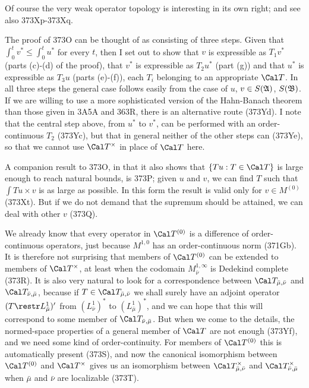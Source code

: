 {Of course the very weak operator topology is interesting in its own
right;  and see also 373Xp-373Xq.
     
The proof of 373O can be thought of as consisting of three steps.
Given that $\int_0^tv^*\le\int_0^tu^*$ for every $t$, then I set out to
show that $v$ is expressible as $T_1v^*$ (parts (c)-(d) of the proof),
that $v^*$ is expressible as $T_2u^*$ (part (g)) and that $u^*$ is
expressible as $T_3u$
(parts (e)-(f)), each $T_i$ belonging to an appropriate $\Cal T$.   In
all three steps the general case follows easily from the case of $u$,
$v\in S(\frak A)$, $S(\frak B)$.   If we are willing to use a more
sophisticated version of the
Hahn-Banach theorem than those given in 3A5A and 363R, there is
an alternative route (373Yd).   I note that the central step above, from
$u^*$ to $v^*$, can be performed with an order-continuous $T_2$ (373Yc),
but that in general neither of the other steps can (373Ye), so that we
cannot use $\Cal T^{\times}$ in place of $\Cal T$ here.
     
A companion result to 373O, in that it also shows that
$\{Tu:T\in\Cal T\}$ is large enough to reach natural bounds, is 373P;
given $u$ and
$v$, we can find $T$ such that $\int Tu\times v$ is as large as
possible.   In this form the result is valid only for $v\in M^{(0)}$
(373Xt).  But if we do not demand that the supremum should be attained,
we can deal with other $v$ (373Q).
     
We already know that every operator in $\Cal T^{(0)}$ is a difference of
order-continuous operators, just because $M^{1,0}$ has an
order-continuous norm (371Gb).   It is therefore not surprising that
members of $\Cal T^{(0)}$ can be extended to members of $\Cal T^{\times}$, 
at least when the codomain $M^{1,\infty}_{\bar\nu}$ is
Dedekind complete (373R).   It is also very natural to look for a
correspondence between $\Cal T_{\bar\mu,\bar\nu}$ and 
$\Cal T_{\bar\nu,\bar\mu}$, because if $T\in\Cal T_{\bar\mu,\bar\nu}$ 
we shall surely have an adjoint operator $(T\restr L^1_{\bar\mu})'$ from
$(L^1_{\bar\nu})^*$ to $(L^1_{\bar\mu})^*$, and we can hope that this
will correspond to some member of $\Cal T_{\bar\nu,\bar\mu}$.   But when
we come to the details, the normed-space properties of a general member
of $\Cal T$ are not enough (373Yf), and we need some kind of
order-continuity.   For members of $\Cal T^{(0)}$ this is automatically
present (373S), and now the canonical isomorphism between $\Cal T^{(0)}$
and $\Cal T^{\times}$ gives us an isomorphism between 
$\Cal T^{\times}_{\bar\mu,\bar\nu}$ and 
$\Cal T^{\times}_{\bar\nu,\bar\mu}$
when $\bar\mu$ and $\bar\nu$ are localizable (373T).
}%
     
\discrpage
     
